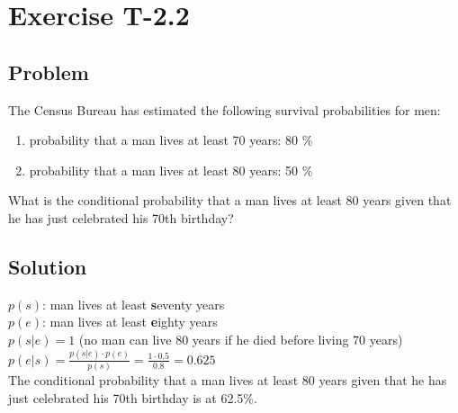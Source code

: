\section*{Exercise T-2.2}

\subsection*{Problem}
The Census Bureau has estimated the following survival probabilities for men:
\begin{enumerate}
	\item probability that a man lives at least 70 years: 80 \%
	\item probability that a man lives at least 80 years: 50 \%
\end{enumerate}

What is the conditional probability that a man lives at least 80 years given that he has just celebrated his 70th birthday?

\subsection*{Solution}

$p(s)$: man lives at least \textbf{s}eventy years\\
$p(e)$: man lives at least \textbf{e}ighty years\\

$p(s|e) = 1$ (no man can live 80 years if he died before living 70 years)\\
$p(e|s) = \frac{p(s|e)\cdot p(e)}{p(s)} = \frac{1\cdot 0.5}{0.8} = 0.625$\\
The conditional probability that a man lives at least 80 years given that he has just celebrated his 70th birthday is at 62.5\%.